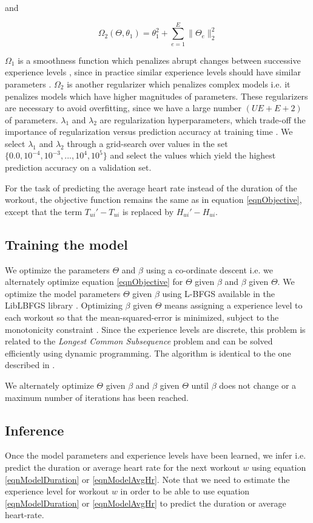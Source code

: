 \documentclass{acm_proc_article-sp}
\begin{document}
and

$$\Omega_2(\Theta, \theta_1) = \theta_1^2 + \sum_{e=1}^{E}{\|\Theta_e \|_2^2}$$

$\Omega_1$ is a smoothness function which penalizes abrupt changes between successive experience levels \cite{www13}, since in practice similar experience levels should have similar parameters \cite{www13}. $\Omega_2$ is another regularizer which penalizes complex models i.e. it penalizes models which have higher magnitudes of parameters. These regularizers are necessary to avoid overfitting, since we have a large number $(UE + E + 2)$ of parameters. $\lambda_1$ and $\lambda_2$ are regularization hyperparameters, which trade-off the importance of regularization versus prediction accuracy at training time \cite{www13}. We select $\lambda_1$ and $\lambda_2$ through a grid-search over values in the set $\{0.0, 10^{-4}, 10^{-3},..., 10^4, 10^5\}$ and select the values which yield the highest prediction accuracy on a validation set.

For the task of predicting the average heart rate instead of the duration of the workout, the objective function remains the same as in equation \ref{eqnObjective}, except that the term $T_{ui}' - T_{ui}$ is replaced by $H_{ui}' - H_{ui}$.

\subsection{Training the model}
We optimize the parameters $\Theta$ and $\beta$ using a co-ordinate descent \cite{coordinateDescentWiki} i.e. we alternately optimize equation \ref{eqnObjective} for $\Theta$ given $\beta$ and $\beta$ given $\Theta$. We optimize the model parameters $\Theta$ given $\beta$ using L-BFGS \cite{lbfgs} available in the LibLBFGS library \cite{liblbfgs}. Optimizing $\beta$ given $\Theta$ means assigning a experience level to each workout so that the mean-squared-error is minimized, subject to the monotonicity constraint \cite{www13}. Since the experience levels are discrete, this problem is related to the \emph{Longest Common Subsequence} problem \cite{lcs} and can be solved efficiently using dynamic programming. The algorithm is identical to the one described in \cite{www13}.

We alternately optimize $\Theta$ given $\beta$ and $\beta$ given $\Theta$ until $\beta$ does not change or a maximum number of iterations has been reached.

\subsection{Inference}
Once the model parameters and experience levels have been learned, we infer i.e. predict the duration or average heart rate for the next workout $w$ using equation \ref{eqnModelDuration} or \ref{eqnModelAvgHr}. Note that we need to estimate the experience level for workout $w$ in order to be able to use equation \ref{eqnModelDuration} or \ref{eqnModelAvgHr} to predict the duration or average heart-rate. 
\end{document}
